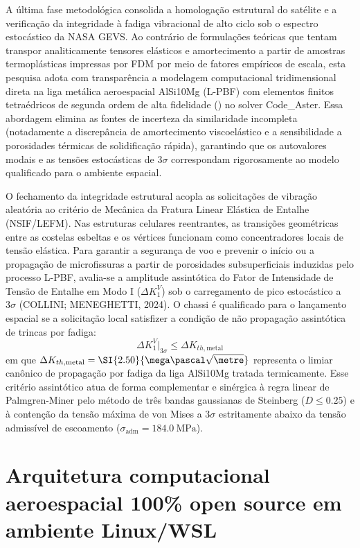 A última fase metodológica consolida a homologação estrutural do satélite e a verificação da integridade à fadiga vibracional de alto ciclo sob o espectro estocástico da NASA GEVS. Ao contrário de formulações teóricas que tentam transpor analiticamente tensores elásticos e amortecimento a partir de amostras termoplásticas impressas por FDM por meio de fatores empíricos de escala, esta pesquisa adota com transparência a modelagem computacional tridimensional direta na liga metálica aeroespacial AlSi10Mg (L-PBF) com elementos finitos tetraédricos de segunda ordem de alta fidelidade () no solver Code\_Aster. Essa abordagem elimina as fontes de incerteza da similaridade incompleta (notadamente a discrepância de amortecimento viscoelástico e a sensibilidade a porosidades térmicas de solidificação rápida), garantindo que os autovalores modais e as tensões estocásticas de $3\sigma$ correspondam rigorosamente ao modelo qualificado para o ambiente espacial.

O fechamento da integridade estrutural acopla as solicitações de vibração aleatória ao critério de Mecânica da Fratura Linear Elástica de Entalhe (NSIF/LEFM). Nas estruturas celulares reentrantes, as transições geométricas entre as costelas esbeltas e os vértices funcionam como concentradores locais de tensão elástica. Para garantir a segurança de voo e prevenir o início ou a propagação de microfissuras a partir de porosidades subsuperficiais induzidas pelo processo L-PBF, avalia-se a amplitude assintótica do Fator de Intensidade de Tensão de Entalhe em Modo I ($\Delta K_1^{V}$) sob o carregamento de pico estocástico a $3\sigma$ (COLLINI; MENEGHETTI, 2024). O chassi é qualificado para o lançamento espacial se a solicitação local satisfizer a condição de não propagação assintótica de trincas por fadiga:
\begin{equation}
  \Delta K_1^{V}\big|_{3\sigma} \le \Delta K_{th,\text{metal}}
  \label{eq:lefm}
\end{equation}
em que $\Delta K_{th,\text{metal}} = \SI{2.50}{\mega\pascal\sqrt{\metre}}$ representa o limiar canônico de propagação por fadiga da liga AlSi10Mg tratada termicamente. Esse critério assintótico atua de forma complementar e sinérgica à regra linear de Palmgren-Miner pelo método de três bandas gaussianas de Steinberg ($D \le \num{0.25}$) e à contenção da tensão máxima de von Mises a $3\sigma$ estritamente abaixo da tensão admissível de escoamento ($\sigma_{\text{adm}} = \SI{184.0}{\mega\pascal}$).

\section{Arquitetura computacional aeroespacial 100\% open source em ambiente Linux/WSL}
\label{sec:opensource}

